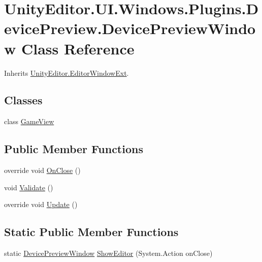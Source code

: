 \hypertarget{class_unity_editor_1_1_u_i_1_1_windows_1_1_plugins_1_1_device_preview_1_1_device_preview_window}{}\section{Unity\+Editor.\+U\+I.\+Windows.\+Plugins.\+Device\+Preview.\+Device\+Preview\+Window Class Reference}
\label{class_unity_editor_1_1_u_i_1_1_windows_1_1_plugins_1_1_device_preview_1_1_device_preview_window}


Inherits \hyperlink{class_unity_editor_1_1_editor_window_ext}{Unity\+Editor.\+Editor\+Window\+Ext}.

\subsection*{Classes}
\begin{DoxyCompactItemize}
\item 
class \hyperlink{class_unity_editor_1_1_u_i_1_1_windows_1_1_plugins_1_1_device_preview_1_1_device_preview_window_1_1_game_view}{Game\+View}
\end{DoxyCompactItemize}
\subsection*{Public Member Functions}
\begin{DoxyCompactItemize}
\item 
override void \hyperlink{class_unity_editor_1_1_u_i_1_1_windows_1_1_plugins_1_1_device_preview_1_1_device_preview_window_a9c92405a7756778216b73791d4bada3a}{On\+Close} ()
\item 
void \hyperlink{class_unity_editor_1_1_u_i_1_1_windows_1_1_plugins_1_1_device_preview_1_1_device_preview_window_a84c35b869dd355c8e58853cd8622554c}{Validate} ()
\item 
override void \hyperlink{class_unity_editor_1_1_u_i_1_1_windows_1_1_plugins_1_1_device_preview_1_1_device_preview_window_ac51f3c90df4fb9b491e978e33d73751d}{Update} ()
\end{DoxyCompactItemize}
\subsection*{Static Public Member Functions}
\begin{DoxyCompactItemize}
\item 
static \hyperlink{class_unity_editor_1_1_u_i_1_1_windows_1_1_plugins_1_1_device_preview_1_1_device_preview_window}{Device\+Preview\+Window} \hyperlink{class_unity_editor_1_1_u_i_1_1_windows_1_1_plugins_1_1_device_preview_1_1_device_preview_window_a64fbac458a7e0e39551858fe450ed9aa}{Show\+Editor} (System.\+Action on\+Close)
\end{DoxyCompactItemize}
